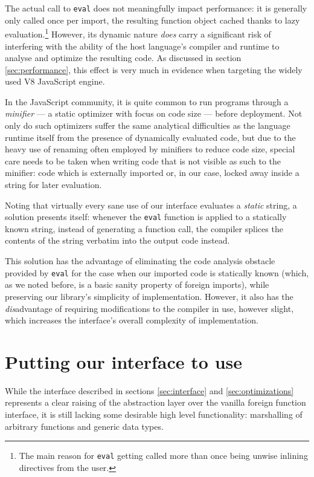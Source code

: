 \documentclass[preprint]{sigplanconf}
\begin{document}
The actual call to \lstinline!eval! does not meaningfully impact
performance: it is generally only called once per import,
the resulting function object cached thanks to lazy evaluation.\footnote{
  The main reason for \lstinline!eval! getting called more than once
  being unwise inlining directives from the user.
}
However, its dynamic nature \emph{does}
carry a significant risk of interfering with the ability of the host language's
compiler and runtime to analyse and optimize the resulting code.
As discussed in section \ref{sec:performance}, this effect is very much in
evidence when targeting the widely used V8 JavaScript engine.

In the JavaScript community, it is quite common to run programs through a
\emph{minifier} --- a static optimizer with focus on code size --- before
deployment. Not only do such optimizers suffer the same analytical
difficulties as the language runtime itself from the presence of dynamically
evaluated code, but due to the heavy use of
renaming often employed by minifiers to reduce code size, special care needs
to be taken when writing code that is not visible as such to the minifier:
code which is externally imported or, in our case, locked away inside a string
for later evaluation.

Noting that virtually every sane use of our interface evaluates a \emph{static}
string, a solution presents itself: whenever the \lstinline!eval! function
is applied to a statically known string, instead of generating a function call,
the compiler splices the contents of the string verbatim into the output code
instead.

This solution has the advantage of eliminating the code analysis obstacle
provided by \lstinline!eval! for the case when our imported code is statically
known (which, as we noted before, is a basic sanity property of foreign
imports), while preserving our library's simplicity of implementation.
However, it also has the \emph{dis}advantage of requiring modifications to the
compiler in use, however slight, which increases the interface's overall
complexity of implementation.

\section{Putting our interface to use}
\label{sec:extensions}
While the interface described in sections \ref{sec:interface} and
\ref{sec:optimizations} represents a clear raising of the abstraction layer
over the vanilla foreign function interface, it is still lacking some
desirable high level functionality: marshalling of arbitrary functions and
generic data types.
\end{document}
